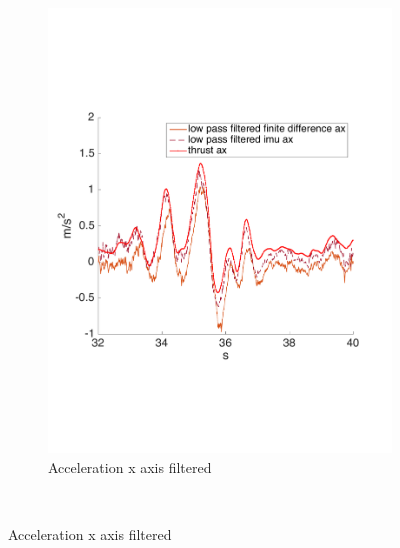 \begin{figure}[!htbp]
\begin{subfigure}[b]{0.45\textwidth}
     \includegraphics[width=\textwidth]{img/acceleration_mass_changed_filtered_x.pdf}
        \caption{Acceleration x axis filtered}
        \label{fig:comparison_accx_fil}
   \end{subfigure}\\[20pt]
   

\end{figure}
